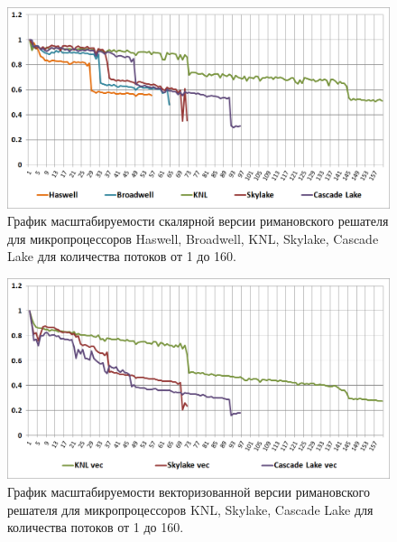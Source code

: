 \begin{figure}[ht]
	\centering
	\includegraphics[width=1.0\textwidth]{./pics/text_3_omp2/eff_scalar.png}
	\caption{График масштабируемости скалярной версии римановского решателя для микропроцессоров Haswell, Broadwell, KNL, Skylake, Cascade Lake для количества потоков от 1 до 160.}
	\label{fig:text_3_omp2_eff_scalar}
\end{figure}

\begin{figure}[ht]
	\centering
	\includegraphics[width=1.0\textwidth]{./pics/text_3_omp2/eff_vec}
	\caption{График масштабируемости векторизованной версии римановского решателя для микропроцессоров KNL, Skylake, Cascade Lake для количества потоков от 1 до 160.}
	\label{fig:text_3_omp2_eff_scalar}
\end{figure}
